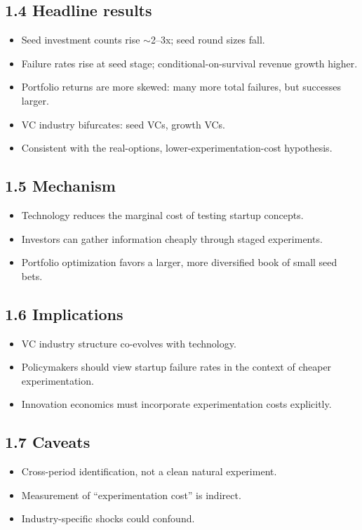 \documentclass[11pt]{article}
\begin{document}
\subsection*{1.4 Headline results}
\begin{itemize}
\item Seed investment counts rise $\sim$2--3x; seed round sizes fall.
\item Failure rates rise at seed stage; conditional-on-survival revenue growth higher.
\item Portfolio returns are more skewed: many more total failures, but successes larger.
\item VC industry bifurcates: seed VCs, growth VCs.
\item Consistent with the real-options, lower-experimentation-cost hypothesis.
\end{itemize}

\subsection*{1.5 Mechanism}
\begin{itemize}
\item Technology reduces the marginal cost of testing startup concepts.
\item Investors can gather information cheaply through staged experiments.
\item Portfolio optimization favors a larger, more diversified book of small seed bets.
\end{itemize}

\subsection*{1.6 Implications}
\begin{itemize}
\item VC industry structure co-evolves with technology.
\item Policymakers should view startup failure rates in the context of cheaper experimentation.
\item Innovation economics must incorporate experimentation costs explicitly.
\end{itemize}

\subsection*{1.7 Caveats}
\begin{alertbox}
\begin{itemize}
\item Cross-period identification, not a clean natural experiment.
\item Measurement of ``experimentation cost'' is indirect.
\item Industry-specific shocks could confound.
\end{itemize}
\end{alertbox}
\end{document}
